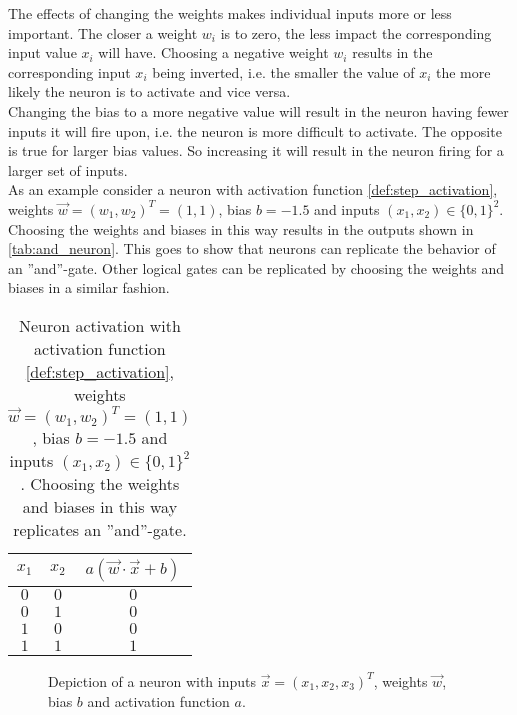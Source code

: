 The effects of changing the weights makes individual inputs more or less important. The closer a weight $w_i$ is to zero, the less impact the corresponding input value $x_i$ will have. Choosing a negative weight $w_i$ results in the corresponding input $x_i$ being inverted, i.e. the smaller the value of $x_i$ the more likely the neuron is to activate and vice versa.\\
Changing the bias to a more negative value will result in the neuron having fewer inputs it will fire upon, i.e. the neuron is more difficult to activate. The opposite is true for larger bias values. So increasing it will result in the neuron firing for a larger set of inputs.\\
As an example consider a neuron with activation function \eqref{def:step_activation}, weights $\vec{w}={(w_1, w_2)}^T=(1, 1)$, bias $b=-1.5$ and inputs $(x_1,x_2)\in{\{0,1\}}^2$. Choosing the weights and biases in this way results in the outputs shown in \autoref{tab:and_neuron}. This goes to show that neurons can replicate the behavior of an ''and''-gate. Other logical gates can be replicated by choosing the weights and biases in a similar fashion.
\begin{table}
\begin{center}
\begin{tabular}{c c|c}
$x_1$ & $x_2$ & $a(\vec{w}\cdot\vec{x}+b)$\\
\hline
$0$ & $0$ & $0$\\
$0$ & $1$ & $0$\\
$1$ & $0$ & $0$\\
$1$ & $1$ & $1$\\
\end{tabular}
\caption[''OR''-neuron activations]{Neuron activation with activation function \eqref{def:step_activation}, weights $\vec{w}={(w_1, w_2)}^T=(1, 1)$, bias $b=-1.5$ and inputs $(x_1,x_2)\in{\{0,1\}}^2$. Choosing the weights and biases in this way replicates an ''and''-gate.}\label{tab:and_neuron}
\end{center}
\end{table}

\begin{figure}
\centering

\caption[Neuron]{Depiction of a neuron with inputs $\vec{x}={(x_1, x_2, x_3)}^T$, weights $\vec{w}$, bias $b$ and activation function $a$.}\label{fig:neuron}
\end{figure}

